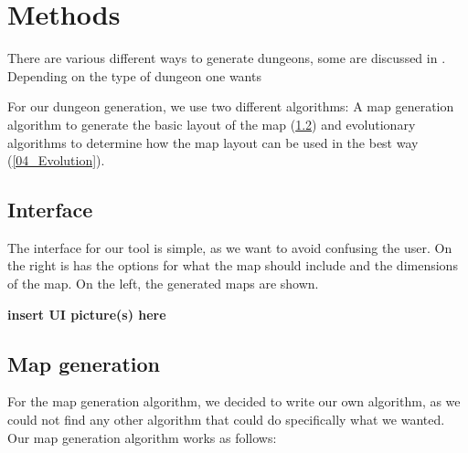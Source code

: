 \section{Methods}
\label{04}

There are various different ways to generate dungeons, some are discussed in \cite[Chapter 3]{PCGBook}. Depending on the type of dungeon one wants

For our dungeon generation, we use two different algorithms: A map generation algorithm to generate the basic layout of the map (\ref{04_MapGeneration}) and evolutionary algorithms\cite[Chapter 2]{IoEC} to determine how the map layout can be used in the best way (\ref{04_Evolution}).

\subsection{Interface}
\label{04_Interface}

The interface for our tool is simple, as we want to avoid confusing the user. On the right is has the options for what the map should include and the dimensions of the map. On the left, the generated maps are shown.

\textbf{insert UI picture(s) here}

\subsection{Map generation}
\label{04_MapGeneration}

For the map generation algorithm, we decided to write our own algorithm, as we could not find any other algorithm that could do specifically what we wanted. Our map generation algorithm works as follows:

